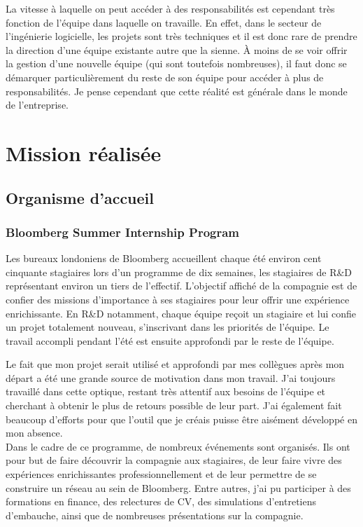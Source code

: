 \documentclass[11pt, oneside, titlepage, a4paper]{article}
\begin{document}
La vitesse à laquelle on peut accéder à des responsabilités est cependant très fonction de l'équipe dans laquelle on travaille. En effet, dans le secteur de l'ingénierie logicielle, les projets sont très techniques et il est donc rare de prendre la direction d'une équipe existante autre que la sienne. À moins de se voir offrir la gestion d'une nouvelle équipe (qui sont toutefois nombreuses), il faut donc se démarquer particulièrement du reste de son équipe pour accéder à plus de responsabilités. Je pense cependant que cette réalité est générale dans le monde de l'entreprise.
\newpage
\section{Mission réalisée}
	\subsection{Organisme d'accueil}
		\subsubsection{Bloomberg Summer Internship Program}
Les bureaux londoniens de Bloomberg accueillent chaque été environ cent cinquante stagiaires lors d'un programme de dix semaines, les stagiaires de R\&D représentant environ un tiers de l'effectif. L'objectif affiché de la compagnie est de confier des missions d'importance à ses stagiaires pour leur offrir une expérience enrichissante. En R\&D notamment, chaque équipe reçoit un stagiaire et lui confie un projet totalement nouveau, s'inscrivant dans les priorités de l'équipe. Le travail accompli pendant l'été est ensuite approfondi par le reste de l'équipe.

Le fait que mon projet serait utilisé et approfondi par mes collègues après mon départ a été une grande source de motivation dans mon travail. J'ai toujours travaillé dans cette optique, restant très attentif aux besoins de l'équipe et cherchant à obtenir le plus de retours possible de leur part. J'ai également fait beaucoup d'efforts pour que l'outil que je créais puisse être aisément développé en mon absence.
\\

Dans le cadre de ce programme, de nombreux événements sont organisés. Ils ont pour but de faire découvrir la compagnie aux stagiaires, de leur faire vivre des expériences enrichissantes professionnellement et de leur permettre de se construire un réseau au sein de Bloomberg. Entre autres, j'ai pu participer à des formations en finance, des relectures de CV, des simulations d'entretiens d'embauche, ainsi que de nombreuses présentations sur la compagnie.
\\
\end{document}
